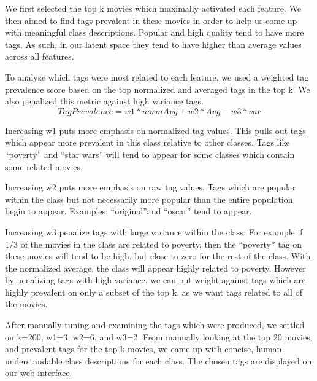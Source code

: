 We first selected the top k movies which maximally activated each feature.  We then aimed to find tags prevalent in these movies in order to help us come up with meaningful class descriptions.  Popular and high quality tend to have more tags.  As such, in our latent space they tend to have higher than average values across all features.

To analyze which tags were most related to each feature, we used a weighted tag prevalence score based on the top normalized and averaged tags in the top k.  We also penalized this metric against high variance tags.
\begin{equation}
\label{eq:tagprev}
TagPrevalence = w1*normAvg + w2*Avg - w3*var
\end{equation}

Increasing w1 puts more emphasis on normalized tag values.  This pulls out tags which appear more prevalent in this class relative to other classes.  Tags like ``poverty'' and ``star wars'' will tend to appear for some classes which contain some related movies.

Increasing w2 puts more emphasis on raw tag values.  Tags which are popular within the class but not necessarily more popular than the entire population begin to appear.  Examples: ``original''and ``oscar'' tend to appear.

Increasing w3 penalize tags with large variance within the class.  For example if 1/3 of the movies in the class are related to poverty, then the ``poverty'' tag on these movies will tend to be high, but close to zero for the rest of the class.  With the normalized average, the class will appear highly related to poverty.  However by penalizing  tags with high variance, we can put weight against tags which are highly prevalent on only a subset of the top k, as we want tags related to all of the movies.

After manually tuning and examining the tags which were produced, we settled on k=200, w1=3, w2=6, and w3=2.  From manually looking at the top 20 movies, and prevalent tags for the top k movies, we came up with concise, human understandable class descriptions for each class.  The chosen tags are displayed on our web interface.